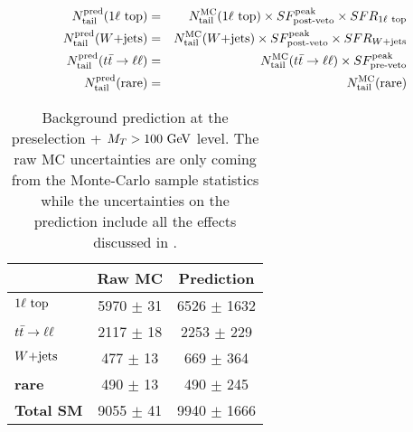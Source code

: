     \begin{eqnarray}
        N^\text{pred}_\text{tail}(1\ell~\text{top}) & = & N^\text{MC}_\text{tail}(1\ell~\text{top})  \times SF_{\text{post-veto}}^{\text{peak}} \times SFR_{1\ell~\text{top}} \label{eq:prediction1ltop}  \\
        N^\text{pred}_\text{tail}(\text{$W$+jets})        & = & N^\text{MC}_\text{tail}(\text{$W$+jets})         \times SF_{\text{post-veto}}^{\text{peak}}  \times SFR_{\text{$W$+jets}}                             \\
        N^\text{pred}_\text{tail}(t\bar{t} \rightarrow \ell \ell)  & = & N^\text{MC}_\text{tail}(t\bar{t} \rightarrow \ell \ell)   \times SF_{\text{pre-veto}}^{\text{peak}}                                                \\
        N^\text{pred}_\text{tail}(\text{rare})   & = & N^\text{MC}_\text{tail}(\text{rare})                                           \label{eq:predictionrare}
    \end{eqnarray}

    \begin{table}[!ht]
        \begin{center}
            \begin{tabular}{|l|c|c|}
                \hline
                                         &  \textbf{Raw MC}    & \textbf{Prediction}       \\
                \hline
                \textbf{$1\ell~\text{top}$} &  5970 $\pm$ 31      & 6526 $\pm$ 1632     \\
                \textbf{$t\bar{t} \rightarrow \ell \ell$}  &  2117 $\pm$ 18      & 2253 $\pm$  229     \\
                \textbf{$\text{$W$+jets}$}        &   477 $\pm$ 13      &  669 $\pm$  364     \\
                \textbf{rare}            &   490 $\pm$ 13      &  490 $\pm$  245     \\
                \hline
                \textbf{Total SM}        &  9055 $\pm$ 41      & 9940 $\pm$ 1666     \\
                \hline
            \end{tabular}
            \caption{Background prediction at the preselection + $M_T > 100~\text{GeV}$
            level.  The raw MC uncertainties are only coming from the
            Monte-Carlo sample statistics while the uncertainties on the
            prediction include all the effects discussed in
            .}
            \label{tab:predictionPreselection}
        \end{center}
    \end{table}

